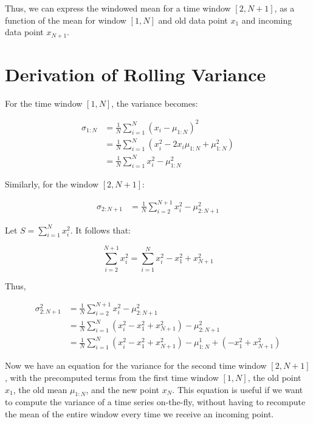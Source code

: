 \documentclass[12pt]{article}
\begin{document}
Thus, we can express the windowed mean for a time window $[2,N+1]$, as a function of the mean for window $[1,N]$ and old data point $x_1$ and incoming data point $x_{N+1}$.


\section{Derivation of Rolling Variance}

For the time window $[1,N]$, the variance becomes:

\begin{align}
 \sigma_{1:N} &= \frac{1}{N} \sum^{N}_{i=1} \left( x_i - \mu_{1:N} \right)^2\\
	     &= \frac{1}{N} \sum^{N}_{i=1} \left( x_i^2  -2x_i \mu_{1:N} + \mu_{1:N}^2 \right)\\
	     &= \frac{1}{N} \sum^{N}_{i=1} x_i^2 - \mu_{1:N}^2 
 \label{mean}
\end{align}


Similarly, for the window $[2,N+1]$:

\begin{align}
 \sigma_{2:N+1} &= \frac{1}{N} \sum^{N+1}_{i=2} x_i^2 - \mu_{2:N+1}^2 
 \label{mean}
\end{align}
 
 Let $S=\sum_{i=1}^N x_i^2$. It follows that:
 
 \begin{equation}
     \sum_{i=2}^{N+1} x_i^2 = \sum_{i=1}^N x_i^2 - x_1^2 + x_{N+1}^2
 \end{equation}
 
 Thus, 
 
  
 \begin{align}
     \sigma^2_{2:N+1} &= \frac{1}{N} \sum_{i=2}^{N+1} x_i^2  - \mu^2_{2:N+1} \\
     &=  \frac{1}{N}  \sum_{i=1}^N \left( x_i^2 - x_1^2 + x_{N+1}^2 \right) - \mu^2_{2:N+1} \\
     &=  \frac{1}{N}  \sum_{i=1}^N \left( x_i^2 - x_1^2 + x_{N+1}^2 \right) - \mu^1_{1:N} + \left( -x_1^2 + x_{N+1}^2 \right)
 \end{align}
 
 Now we have an equation for the variance for the second time window $[2,N+1]$, with the precomputed terms from the first time window $[1,N]$, the old point $x_1$, the old mean $\mu_{1:N}$, and the new point $x_N$. This equation is useful if we want to compute the variance of a time series on-the-fly, without having to recompute the mean of the entire window every time we receive an incoming point.
 
 

 
 
\end{document}
